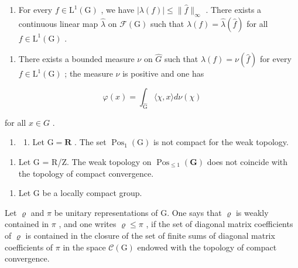 \begin{enumerate}
\def\labelenumi{\alph{enumi})}
\setcounter{enumi}{6}
\tightlist
\item
  For every \(f \in \mathrm{L}^{1}(\mathrm{G})\) , we have \(|\lambda(f)| \leqslant \| \widehat{f} \|_{\infty}\) . There exists a continuous linear map \(\widehat{\lambda}\) on \(\mathcal{F}(\mathrm{G})\) such that \(\lambda(f) = \widehat{\lambda}(\widehat{f})\) for all \(f \in \mathrm{L}^{1}(\mathrm{G})\) .
\end{enumerate}

\begin{enumerate}
\def\labelenumi{\alph{enumi})}
\setcounter{enumi}{7}
\tightlist
\item
  There exists a bounded measure \(\nu\) on \(\widehat{G}\) such that \(\lambda(f) = \nu(\widehat{f})\) for every \(f \in \mathrm{L}^{1}(\mathrm{G})\) ; the measure \(\nu\) is positive and one has
\end{enumerate}

\[
\varphi (x) = \int_ {\widehat {\mathrm{G}}} \langle \chi , x \rangle d \nu (\chi)
\]

for all \(x \in G\) .

\begin{enumerate}
\def\labelenumi{\arabic{enumi})}
\setcounter{enumi}{9}
\tightlist
\item
  \begin{enumerate}
  \def\labelenumii{\alph{enumii})}
  \tightlist
  \item
    Let \(\mathrm{G} = \mathbf{R}\) . The set \(\operatorname{Pos}_1(\mathrm{G})\) is not compact for the weak topology.
  \end{enumerate}
\end{enumerate}

\begin{enumerate}
\def\labelenumi{\alph{enumi})}
\setcounter{enumi}{1}
\tightlist
\item
  Let G = R/Z. The weak topology on \(\operatorname{Pos}_{\leqslant1}(\mathbf{G})\) does not coincide with the topology of compact convergence.
\end{enumerate}

\begin{enumerate}
\def\labelenumi{\arabic{enumi})}
\setcounter{enumi}{10}
\tightlist
\item
  Let G be a locally compact group.
\end{enumerate}

Let \(\varrho\) and \(\pi\) be unitary representations of G. One says that \(\varrho\) is weakly contained in \(\pi\) , and one writes \(\varrho \leqslant \pi\) , if the set of diagonal matrix coefficients of \(\varrho\) is contained in the closure of the set of finite sums of diagonal matrix coefficients of \(\pi\) in the space \(\mathcal{C}(\mathrm{G})\) endowed with the topology of compact convergence.


